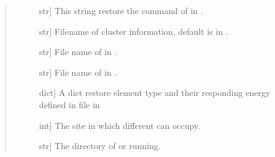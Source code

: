 \documentclass[letterpaper,10pt,english]{sphinxmanual}
\begin{document}
\begin{fulllineitems}
\begin{quote}
\begin{description}
\begin{description}
\item[{}] \leavevmode{[}str{]}
This string restore the command of  in .

\item[{}] \leavevmode{[}str{]}
Filename of cluster information, default is 
in .

\item[{}] \leavevmode{[}str{]}
File name of  in .

\item[{}] \leavevmode{[}str{]}
File name of  in .

\item[{}] \leavevmode{[}dict{]}
A dict restore element type and their responding energy defined in
 file in 

\item[{}] \leavevmode{[}int{]}
The site in which different can occupy.

\item[{}] \leavevmode{[}str{]}
The directory of  or  running.

\end{description}

\end{description}\end{quote}

\begin{fulllineitems}
\label{\detokenize{pygace:pygace.ce.CE.COMPARE_CRYSTAL}}
\end{fulllineitems}


\begin{fulllineitems}
\label{\detokenize{pygace:pygace.ce.CE.CORRDUMP}}
\end{fulllineitems}



\end{fulllineitems}
\end{document}
